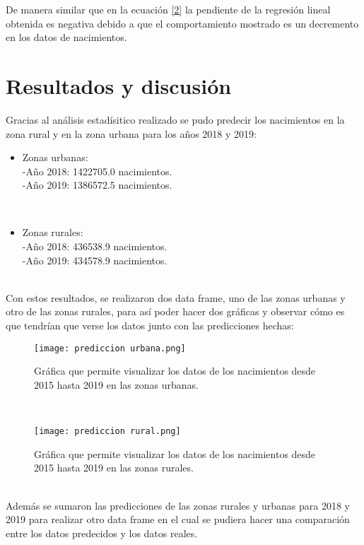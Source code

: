 \documentclass{article}
\begin{document}
De manera similar que en la ecuación \eqref{2} la pendiente de la regresión lineal obtenida es negativa debido a que el comportamiento mostrado es un decremento en los datos de nacimientos.


\section{Resultados y discusión}

Gracias al análisis estadísitico realizado se pudo predecir los nacimientos en la zona rural y en la zona urbana para los años 2018 y 2019: 
\begin{itemize}
    \item Zonas urbanas: \\
    -Año 2018: 1422705.0 nacimientos.\\
    -Año 2019: 1386572.5 nacimientos.
\end{itemize}\\

\begin{itemize}
    \item Zonas rurales: \\
    -Año 2018: 436538.9 nacimientos.\\
    -Año 2019: 434578.9 nacimientos.
\end{itemize}\\

Con estos resultados, se realizaron dos data frame, uno de las zonas urbanas y otro de las zonas rurales, para así poder hacer dos gráficas y observar cómo es que tendrían que verse los datos junto con las predicciones hechas: 

\begin{figure}[h]
    \centering
    \texttt{[image: prediccion urbana.png]}
    \caption{Gráfica que permite visualizar los datos de los nacimientos desde 2015 hasta 2019 en las zonas urbanas.}
    \label{fig:my_label}
\end{figure}\\

\begin{figure}[h]
    \centering
    \texttt{[image: prediccion rural.png]}
    \caption{Gráfica que permite visualizar los datos de los nacimientos desde 2015 hasta 2019 en las zonas rurales.}
    \label{fig:my_label}
\end{figure}\\

Además se sumaron las predicciones de las zonas rurales y urbanas para 2018 y 2019 para realizar otro data frame en el cual se pudiera hacer una comparación entre los datos predecidos y los datos reales.
\end{document}
